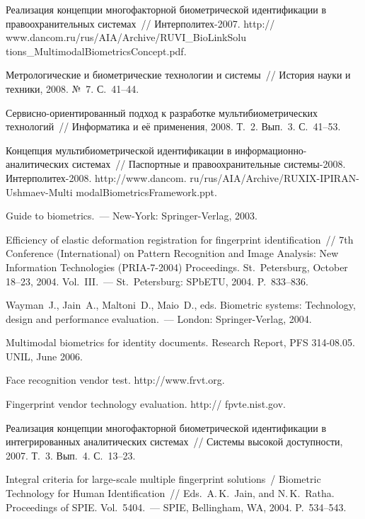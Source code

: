 \begin{multicols}{2}
{{\begin{thebibliography}{99}
Реализация концепции многофакторной биометрической идентификации в пра\-во\-ох\-ра\-ни\-тель\-ных 
системах~// Интерполитех-2007. {\sf 
http:// www.dancom.ru/rus/AIA/Archive/RUVI\_BioLinkSolu
tions\_MultimodalBiometricsConcept.pdf}.

Метрологические и биометрические технологии и системы~// История науки и техники, 2008. №~7. 
С.~41--44.

Сервисно-ориентированный подход к разработке мультибиометрических технологий~// 
Информатика и её применения, 2008. Т.~2. Вып.~3. С.~41--53.

Концепция мультибиометрической идентификации в информационно-аналитических системах~// 
Паспортные и правоохранительные сис\-темы-2008. Интерполитех-2008. {\sf 
http://www.dancom. ru/rus/AIA/Archive/RUXIX-IPIRAN-Ushmaev-Multi modalBiometricsFramework.ppt}.

Guide to biometrics.~--- New-York: Springer-Verlag, 2003.

Efficiency of elastic deformation registration for fingerprint identification~// 7th Conference  (International) 
on Pattern Recognition and Image Analysis: New Information Technologies (PRIA-7-2004) Proceedings. St.\ Petersburg, 
October 18--23, 2004. Vol.~III.~--- St.\ Petersburg: \mbox{SPbETU}, 2004. 
P.~833--836.

Wayman~J., Jain~A., Maltoni~D., Maio~D., eds.
Biometric systems: Technology, design and performance evaluation.~--- London: Springer-Verlag, 2004.

Multimodal biometrics for identity documents. Research Report, PFS 314-08.05. UNIL, June 2006.


Face recognition vendor test. {\sf http://www.frvt.org}.  

Fingerprint vendor technology evaluation. {\sf http:// fpvte.nist.gov}.

Реализация концепции многофакторной биометрической идентификации в интегрированных 
аналитических системах~// Системы высокой доступности, 2007. Т.~3. Вып.~4. С.~13--23.

Integral criteria for large-scale multiple fingerprint solutions~/ Biometric Technology for Human 
Identification~// Eds.\ A.\,K.~Jain, and N.\,K.~Ratha. Proceedings of SPIE. Vol.~5404.~--- SPIE, Bellingham, 
WA, 2004. P.~534--543.


\end{thebibliography}}}
\end{multicols}
